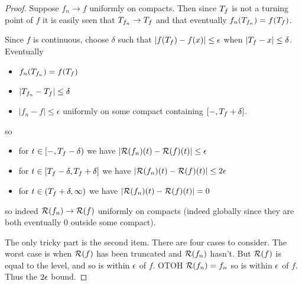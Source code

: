 {\begin{proof}
{    \newcommand{\fn}{f_n}

    \newcommand{\T}{\stripleavetime{f}}
    \newcommand{\Tn}{\stripleavetime{\fn}}

    Suppose $\fn \to f$ uniformly on compacts.  Then since $\T$ is not
    a turning point of $f$ it is easily seen that $\Tn \to \T$ and
    that eventually $\fn(\Tn) = f(\T)$.

    \renewcommand{\d}{\delta}
    \newcommand{\e}{\epsilon}
    \newcommand{\starttime}{-}

    Since $f$ is continuous, choose $\d$ such that
    $|f(\T) - f(x)| \le \epsilon$ when
    $|\T - x| \le \delta$.  Eventually
    \begin{itemize}
    \item $\fn(\Tn) = f(\T)$
    \item $|\Tn - \T| \le \d$
    \item $|\fn - f| \le \e$ uniformly on some compact containing
      $[\starttime, \T+\d]$.
    \end{itemize}

    \newcommand{\stoppedfn}{\Res{\fn}}
    \newcommand{\stoppedf}{\Res{f}}

    \newcommand{\condition}[2]{for $t \in {#1}$ we have
      $|\stoppedfn(t) - \stoppedf(t)| #2$}
    so
    \begin{itemize}
    \item \condition{[\starttime, \T-\d)}{\le \e}
    \item \condition{[\T-\d, \T+\d]}{\le 2\e}
    \item \condition{(\T+\d, \infty)}{= 0}
    \end{itemize}
    so indeed $\stoppedfn \to \stoppedf$ uniformly on compacts (indeed
    globally since they are both eventually $0$ outside some
    compact).}{The only tricky part is the second item.  There are
      four cases to consider.  The worst case is when $\stoppedf$ has
      been truncated and $\stoppedfn$ hasn't.  But $\stoppedf$ is
      equal to the level, and so is within $\e$ of $f$.  OTOH
      $\stoppedfn = \fn$ so is within $\e$ of $f$.  Thus the $2\e$
      bound.}
\end{proof}
}
